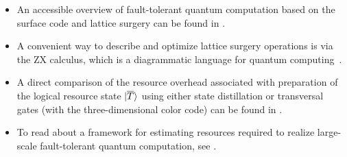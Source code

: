 \begin{refsection}
\begin{itemize}
\item An accessible overview of fault-tolerant quantum computation based on the surface code and lattice surgery can be found in  \cite{litinski2019gameofsurfacecodes}. 
\item A convenient way to describe and optimize lattice surgery operations is via the ZX calculus, which is a diagrammatic language for quantum computing~\cite{coecke2017picturingQuantumProcesses,deBeaudrap2020ZXcalculusLatticeSurgery}.
\item A direct comparison of the resource overhead associated with preparation of the logical resource state $\lvert\overline T\rangle$ using either state distillation or transversal gates (with the three-dimensional color code) can be found in  \cite{beverland2021costUniversality}.
\item To read about a framework for estimating resources required to realize large-scale fault-tolerant quantum computation, see  \cite{Beverland2022Requirements}.
\end{itemize}

\printbibliography[heading=secbib,segment=\therefsegment]

\end{refsection}